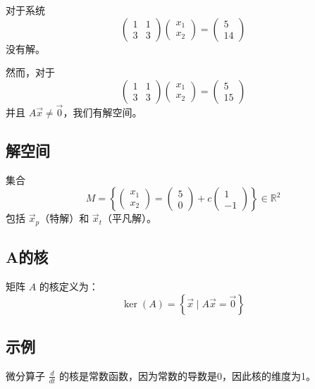 \documentclass{ctexart}
\begin{document}
对于系统
\[ \begin{pmatrix}
    1 & 1 \\
    3 & 3
\end{pmatrix} \begin{pmatrix}
    x_1 \\
    x_2
\end{pmatrix} = \begin{pmatrix}
    5 \\
    14
\end{pmatrix} \]
没有解。

然而，对于
\[ \begin{pmatrix}
    1 & 1 \\
    3 & 3
\end{pmatrix} \begin{pmatrix}
    x_1 \\
    x_2
\end{pmatrix} = \begin{pmatrix}
    5 \\
    15
\end{pmatrix} \]
并且 \( A\vec{x} \neq \vec{0} \)，我们有解空间。

\subsection*{解空间}
集合
\[ M = \left\{ \begin{pmatrix}
    x_1 \\
    x_2
\end{pmatrix} = \begin{pmatrix}
    5 \\
    0
\end{pmatrix} + c \begin{pmatrix}
    1 \\
    -1
\end{pmatrix} \right\} \in \mathbb{R}^2 \]
包括 \( \vec{x}_p \)（特解）和 \( \vec{x}_t \)（平凡解）。

\subsection*{A的核}
矩阵 \( A \) 的核定义为：
\[ \ker(A) = \left\{ \vec{x} \mid A\vec{x} = \vec{0} \right\} \]

\subsection*{示例}
微分算子 \( \frac{d}{dt} \) 的核是常数函数，因为常数的导数是0，因此核的维度为1。
\end{document}
